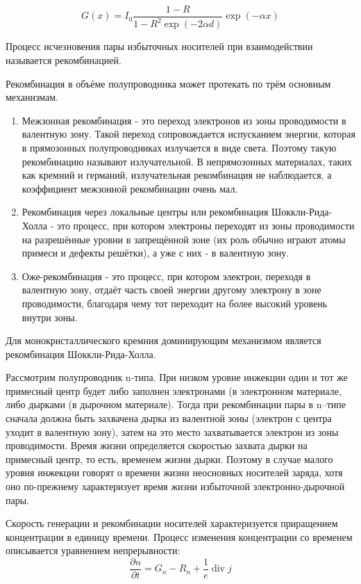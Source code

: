 \begin{equation}
G(x) = I_{0} \frac{1-R}{1-R^{2} \exp(-2 \alpha d)} \exp(-\alpha x)
\end{equation}

Процесс исчезновения пары избыточных носителей при взаимодействии называется рекомбинацией.

Рекомбинация в объёме полупроводника может протекать по трём основным механизмам.

\begin{enumerate}
\item Межзонная рекомбинация - это переход электронов из зоны проводимости в валентную зону. Такой переход сопровождается испусканием энергии, которая в прямозонных полупроводниках излучается в виде света. Поэтому такую рекомбинацию называют излучательной. В непрямозонных материалах, таких как кремний и германий, излучательная рекомбинация не наблюдается, а коэффициент межзонной рекомбинации очень мал.
\item Рекомбинация через локальные центры или рекомбинация Шоккли-Рида-Холла - это процесс, при котором электроны переходят из зоны проводимости на разрешённые уровни в запрещённой зоне (их роль обычно играют атомы примеси и дефекты решётки), а уже с них - в валентную зону.
\item Оже-рекомбинация - это процесс, при котором электрон, переходя в валентную зону, отдаёт часть своей энергии другому электрону в зоне проводимости, благодаря чему тот переходит на более высокий уровень внутри зоны.
\end{enumerate}

Для монокристаллического кремния доминирующим механизмом является рекомбинация Шоккли-Рида-Холла.

Рассмотрим полупроводник n-типа. При низком уровне инжекции один и тот же примесный центр будет либо заполнен электронами (в электронном материале, либо дырками (в дырочном материале). Тогда при рекомбинации пары в n–типе сначала должна быть захвачена дырка из валентной зоны (электрон с центра уходит в валентную зону), затем на это место захватывается электрон из зоны проводимости. Время жизни определяется скоростью захвата дырки на примесный центр, то есть, временем жизни дырки. Поэтому в случае малого уровня инжекции говорят о времени жизни неосновных носителей заряда, хотя оно по-прежнему характеризует время жизни избыточной электронно-дырочной пары.

Скорость генерации и рекомбинации носителей характеризуется приращением концентрации в единицу времени. Процесс изменения концентрации со временем описывается уравнением непрерывности:
\begin{equation}
\frac{\partial n}{\partial t} = G_{n} - R_{n} + \frac{1}{e} \operatorname{div} j
\end{equation}

